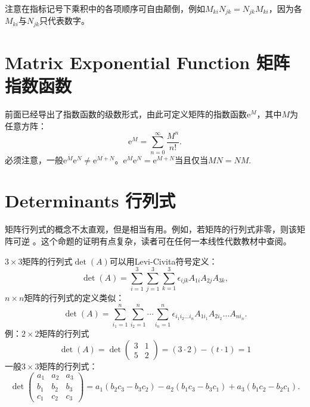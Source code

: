 注意在指标记号下乘积中的各项顺序可自由颠倒，例如$M_{ki} N_{jk} = N_{jk} M_{ki}$，因为各$M_{ki}$与$N_{jk}$只代表数字。


\section[矩阵指数函数]{Matrix Exponential Function 矩阵指数函数}
\label{sec.C.2}
前面已经导出了指数函数的级数形式，由此可定义矩阵的指数函数$\mathrm{e}^M$，其中$M$为任意方阵：
\begin{equation}
\label{equC.4}
	\mathrm{e}^M = \sum_{n = 0}^\infty \frac{M^n}{n!}.
\end{equation}
必须注意，一般$\mathrm{e}^M \mathrm{e}^N \neq \mathrm{e}^{M + N}$。$\mathrm{e}^M \mathrm{e}^N = \mathrm{e}^{M + N}$当且仅当$MN = NM$.

\section[行列式]{Determinants 行列式}
\label{sec.C.3}
矩阵行列式的概念不太直观，但是相当有用。例如，若矩阵的行列式非零，则该矩阵可逆%
%
。这个命题的证明有点复杂，读者可在任何一本线性代数教材中查阅。

$3 \times 3$矩阵的行列式$\det (A)$可以用Levi-Civita符号定义：
\begin{equation}
\label{equC.5}
	\det (A) = \sum_{i = 1}^3 \sum_{j = 1}^3 \sum_{k = 1}^3 \epsilon_{ijk} A_{1i} A_{2j} A_{3k},
\end{equation}
$n \times n$矩阵的行列式的定义类似：
\begin{equation}
\label{equC.6}
	\det (A) = \sum_{i_1 = 1}^n \sum_{i_2 = 1}^n \cdots \sum_{i_n = 1}^n \epsilon_{i_1 i_2 \dots i_n} A_{1 i_1} A_{2 i_2} \dots A_{n i_n}.
\end{equation}
例：$2 \times 2$矩阵的行列式
\[
	\det (A) = \det 
		\begin{pmatrix}
			3 & 1 \\
			5 & 2
		\end{pmatrix}
	= (3 \cdot 2) - (t \cdot 1) = 1
\]
一般$3 \times 3$矩阵的行列式：
\begin{equation}
\label{equC.7}
	\det
		\begin{pmatrix}
			a_1 & a_2 & a_3 \\
			b_1 & b_2 & b_3 \\
			c_1 & c_2 & c_3
		\end{pmatrix}
	= a_1 (b_2 c_3 - b_3 c_2) - a_2 (b_1 c_3 - b_3 c_1) + a_3 (b_1 c_2 - b_2 c_1).
\end{equation}


